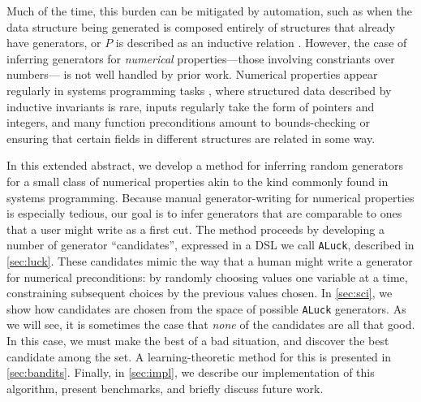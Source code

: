 \documentclass[sigconf,nonacm,review,anonymous]{acmart}
\begin{document}
Much of the time, this burden can be mitigated by automation, such as when the data structure being generated
is composed entirely of structures that already have generators, or $P$ is described as an inductive
relation \cite{gggir}. However, the case of inferring generators for \emph{numerical} properties---those involving constriants over numbers--- is not well
handled by prior work. Numerical properties appear regularly in
systems programming tasks \cite{???}, where structured data described by inductive invariants is rare, inputs regularly
take the form of pointers and integers, and many function preconditions amount to bounds-checking or ensuring
that certain fields in different structures are related in some way.

In this extended abstract, we develop a method for inferring random generators for a small class of numerical properties akin
to the kind commonly found in systems programming. Because manual generator-writing for numerical properties is especially
tedious, our goal is to infer generators that are comparable to ones that a user might write as a first cut.
The method proceeds by developing a number of generator ``candidates'', expressed in a DSL we call \texttt{ALuck}, described in \autoref{sec:luck}.
These candidates mimic the way that a human might write a generator for numerical preconditions: by randomly choosing values
one variable at a time, constraining subsequent choices by the previous values chosen. In \autoref{sec:sci}, we show how candidates
are chosen from the space of possible \texttt{ALuck} generators.
As we will see, it is sometimes the case that \emph{none} of the candidates are all that good. In this case, we must make the best
of a bad situation, and discover the best candidate among the set. A learning-theoretic method for this is presented in \autoref{sec:bandits}.
Finally, in \autoref{sec:impl}, we describe our implementation of
this algorithm, present benchmarks, and briefly discuss future work.


\end{document}
